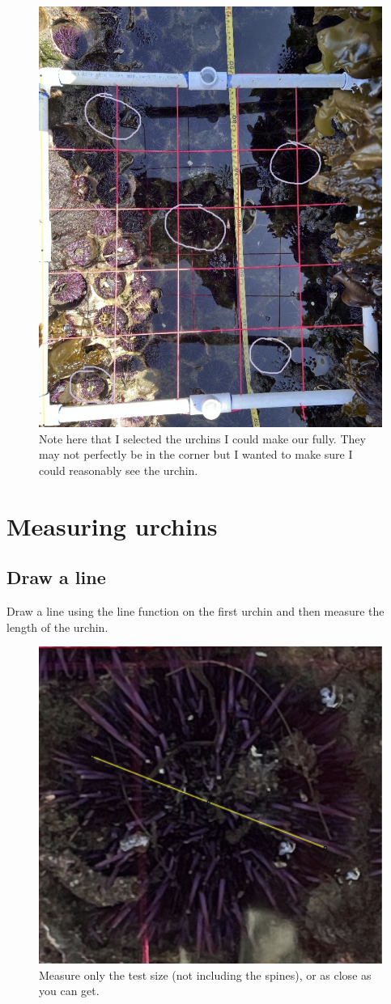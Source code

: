 \documentclass[12pt,letterpaper]{article}
\begin{document}
\begin{figure}[H]
	\centering
	\includegraphics[width=.6\linewidth]{figs/ChoosingUrchins.png}
	\caption{Note here that I selected the urchins I could make our fully. They may not perfectly be in the corner but I wanted to make sure I could reasonably see the urchin.}
	\label{fig:logo}
\end{figure}

\section{Measuring urchins}
\subsection*{Draw a line}

 Draw a line using the line function on the first urchin and then measure the length of the urchin.  
 
\begin{figure}[H]
	\centering
	\includegraphics[width=.4\linewidth]{figs/UrchinSize.png}
	\caption{Measure only the test size (not including the spines), or as close as you can get.}
	\label{fig:logo}
\end{figure}
\end{document}
